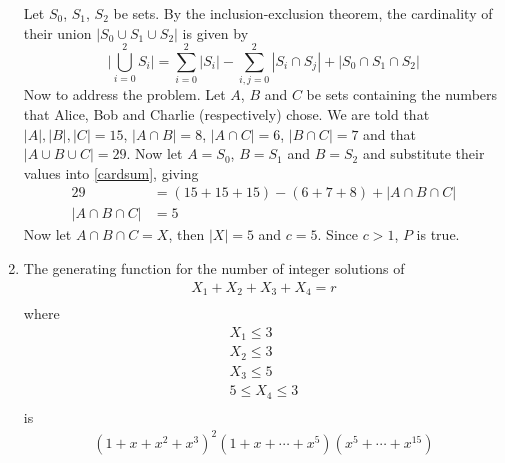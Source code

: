 \documentclass[10pt]{article}
\begin{document}
\begin{enumerate}
                Let $S_0$, $S_1$, $S_2$ be sets. By the inclusion-exclusion
                theorem, the cardinality of their union $|S_0 \cup S_1 \cup
                S_2|$ is given by
                \[
                    \biggr| \bigcup_{i = 0}^2 S_i \biggr| =
                    \sum_{i=0}^2|S_i|
                    - \sum_{i,j=0}^2|S_i \cap S_j|
                    + |S_0 \cap S_1 \cap S_2|
                    \label{cardsum} \tag{$\ast$}
                \]
                Now to address the problem. Let $A$, $B$ and $C$ be sets
                containing the numbers that Alice, Bob and Charlie
                (respectively) chose. We are told that $|A|, |B|, |C| = 15$,
                $|A \cap B| = 8$, $|A \cap C| = 6$, $|B \cap C| = 7$ and that 
                $|A \cup B \cup C| = 29$. Now let $A = S_0$, $B = S_1$ and $B =
                S_2$ and substitute their values into \eqref{cardsum}, giving
                \begin{align*}
                    29 &= (15 + 15 + 15) - (6 + 7 + 8) + |A \cap B \cap C| \\
                    |A \cap B \cap C| &= 5
                \end{align*}
                Now let $A \cap B \cap C = X$, then $|X| = 5$ and $c = 5$.
                Since $c > 1$, $P$ is true.
            \item
                The generating function for the number of integer solutions of
                \begin{align*}
                    X_1 + X_2 + X_3 + X_4 = r \\
                \end{align*}
                where
                \begin{align*}
                    X_1 \leq 3 \\
                    X_2 \leq 3 \\
                    X_3 \leq 5 \\
                    5 \leq X_4 \leq 3 \\
                \end{align*}
                is
                \begin{align*}
                    (1 + x + x^2 + x^3)^2(1 + x + \cdots + x^5)(x^5 + \cdots + x^{15}) \\
                \end{align*}


\end{enumerate}
\end{document}
